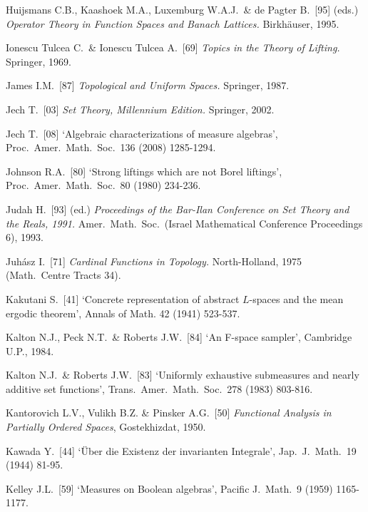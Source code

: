 {Huijsmans C.B., Kaashoek M.A., Luxemburg W.A.J.\ \& de Pagter B.\ [95]
(eds.) {\it Operator Theory in Function Spaces and Banach Lattices.}
Birkh\"auser, 1995.

\medskip %

Ionescu Tulcea C.\ \& Ionescu Tulcea A.\ [69] {\it Topics in the Theory
of Lifting.}  Springer, 1969.  \cmmnt{[\S341 {\it notes\/}.]}

\medskip %

James I.M.\ [87] {\it Topological and Uniform Spaces.}  Springer, 1987.
\cmmnt{[\S3A3, \S3A4.]}

Jech T.\ [03] {\it Set Theory, Millennium Edition.}  Springer, 2002.
\cmmnt{[\S3A1.]}

Jech T.\ [08] `Algebraic characterizations of measure algebras',
Proc.\ Amer.\ Math.\ Soc.\ 136 (2008) 1285-1294.
\cmmnt{[393Xj.]}

Johnson R.A.\ [80] `Strong liftings which are not Borel liftings',
Proc.\ Amer.\ Math.\ Soc.\ 80 (1980) 234-236.   \cmmnt{[345F.]}

Judah H.\ [93] (ed.) {\it Proceedings of the Bar-Ilan Conference on Set
Theory and the Reals, 1991.} Amer.\ Math.\ Soc.\ (Israel Mathematical
Conference Proceedings 6), 1993.

Juh\'asz I.\ [71]  {\it Cardinal Functions in Topology.}  North-Holland,
1975 (Math.\ Centre Tracts 34).  \cmmnt{[\S332 {\it notes\/}.]}

\medskip %

Kakutani S.\ [41] `Concrete representation of abstract $L$-spaces
and the mean ergodic theorem', Annals of Math. 42 (1941) 523-537.
\cmmnt{[369E.]}

Kalton N.J., Peck N.T.\ \& Roberts J.W.\ [84] `An F-space sampler',
Cambridge U.P., 1984.  \cmmnt{[\S375 {\it notes\/}.]}

Kalton N.J.\ \& Roberts J.W.\ [83] `Uniformly exhaustive submeasures and
nearly additive set functions', Trans.\ Amer.\ Math.\ Soc.\ 278 (1983)
803-816.  \cmmnt{[392D, \S392 {\it notes\/}.]}

Kantorovich L.V., Vulikh B.Z. \& Pinsker A.G.\ [50]
{\it Functional Analysis in
Partially Ordered Spaces}, Gostekhizdat, 1950.

Kawada Y.\ [44] `\"Uber die Existenz der invarianten Integrale', Jap.\
J.\ Math.\ 19 (1944) 81-95.  \cmmnt{[\S395 {\it notes\/}.]}

Kelley J.L.\ [59] `Measures on Boolean algebras', Pacific J.\ Math.\ 9
(1959) 1165-1177.  \cmmnt{[\S391 {\it notes\/}.]}

}
